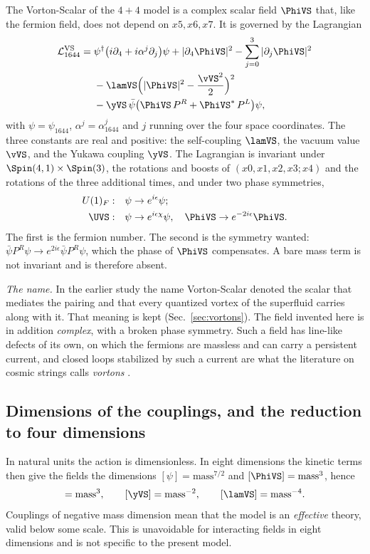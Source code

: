 The Vorton-Scalar of the $4+4$ model is a complex scalar field $\PhiVS$ that, like the fermion field,
does not depend on $x5,x6,x7$. It is governed by the Lagrangian
\begin{align}
\mathcal L_{1644}^{\rm VS}={}&\psi^\dagger\big(i\partial_4+i\alpha^j\partial_j\big)\psi
+|\partial_4\PhiVS|^2-\sum_{j=0}^{3}|\partial_j\PhiVS|^2\nonumber\\
&-\lamVS\Big(|\PhiVS|^2-\frac{\vVS^2}{2}\Big)^{2}\nonumber\\
&-\yVS\,\bar\psi\big(\PhiVS\,P^{R}+\PhiVS^{*}\,P^{L}\big)\psi ,
\label{eq:LVS}
\end{align}
with $\psi=\psi_{1644}$, $\alpha^j=\alpha_{1644}^j$ and $j$ running over the four space coordinates.
The three constants are real and positive: the self-coupling $\lamVS$, the vacuum value $\vVS$, and
the Yukawa coupling $\yVS$. The Lagrangian is invariant under $\Spin(4,1)\times\Spin(3)$, the
rotations and boosts of $(x0,x1,x2,x3;x4)$ and the rotations of the three additional times, and under
two phase symmetries,
\begin{align}
U(1)_F:&\quad\psi\to e^{i\epsilon}\psi;\nonumber\\
\UVS:&\quad\psi\to e^{i\epsilon\chi}\psi,\quad\PhiVS\to e^{-2i\epsilon}\PhiVS .
\label{eq:U1}
\end{align}
The first is the fermion number. The second is the symmetry wanted:
$\bar\psi P^{R}\psi\to e^{2i\epsilon}\bar\psi P^{R}\psi$, which the phase of $\PhiVS$ compensates. A
bare mass term is not invariant and is therefore absent.

\emph{The name.} In the earlier study \cite{NashNCSS} the name Vorton-Scalar denoted the scalar that
mediates the pairing and that every quantized vortex of the superfluid carries along with it. That
meaning is kept (Sec.~\ref{sec:vortons}). The field invented here is in addition \emph{complex}, with
a broken phase symmetry. Such a field has line-like defects of its own, on which the fermions are
massless and can carry a persistent current, and closed loops stabilized by such a current are what
the literature on cosmic strings calls \emph{vortons} \cite{DavisShellard1989}.

\subsection{Dimensions of the couplings, and the reduction to four dimensions}
\label{sec:reduction}

In natural units the action is dimensionless. In eight dimensions the kinetic terms then give the
fields the dimensions $[\psi]=\text{mass}^{7/2}$ and $[\PhiVS]=\text{mass}^{3}$, hence
\begin{equation}
[\vVS]=\text{mass}^{3},\qquad[\yVS]=\text{mass}^{-2},\qquad[\lamVS]=\text{mass}^{-4}.
\end{equation}
Couplings of negative mass dimension mean that the model is an \emph{effective} theory, valid below
some scale. This is unavoidable for interacting fields in eight dimensions and is not specific to the
present model.


